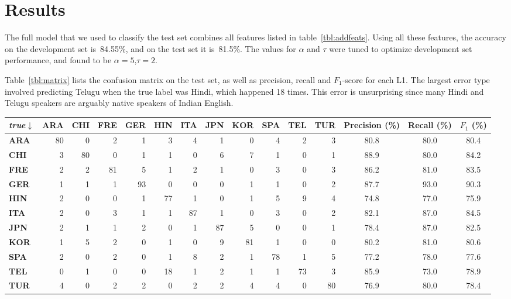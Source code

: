 \documentclass[11pt,letterpaper]{article}
\newcommand{\tref}[1]{table~\ref{#1}}
\newcommand{\Tref}[1]{Table~\ref{#1}}
\begin{document}
\section{Results}
\label{sec:results}
The full model that we used to classify the test set combines all
features listed in \tref{tbl:addfeats}. Using all these features, the
accuracy on the development set is~84.55\%, and on the test set it
is~81.5\%. The values for $\alpha$ and $\tau$ were tuned to optimize development set performance, and found to be $\alpha=5$,$\tau=2$.

\Tref{tbl:matrix} lists the confusion matrix on the test
set, as well as precision, recall and $F_1$-score for each L1.
The largest error type involved predicting Telugu when the true label 
was Hindi, which happened 18 times.  This error is unsurprising since many Hindi and Telugu speakers are arguably native speakers of Indian English.



\begin{table*}[hbt]
\small\centering
\begin{tabular}{>{\bf}l|r@{ }r@{ }r@{ }r@{ }r@{ }r@{ }r@{ }r@{ }r@{ }r@{ }r|ccc} %
\emph{true}$\downarrow$	& \bf ARA & \bf CHI & \bf FRE & \bf GER & \bf HIN & \bf ITA & \bf JPN & \bf KOR & \bf SPA & \bf TEL & \bf TUR & \bf Precision (\%) & \bf Recall (\%) & \bf $F_1$ (\%) \\
\hline
ARA & 80 & 0 & 2 & 1 & 3 & 4 & 1 & 0 & 4 & 2 & 3 & 80.8 & 80.0 & 80.4 \\
CHI & 3 & 80 & 0 & 1 & 1 & 0 & 6 & 7 & 1 & 0 & 1 & 88.9 & 80.0 & 84.2 \\
FRE & 2 & 2 & 81 & 5 & 1 & 2 & 1 & 0 & 3 & 0 & 3 & 86.2 & 81.0 & 83.5 \\
\hline
GER & 1 & 1 & 1 & 93 & 0 & 0 & 0 & 1 & 1 & 0 & 2 & 87.7 & 93.0 & 90.3 \\
HIN & 2 & 0 & 0 & 1 & 77 & 1 & 0 & 1 & 5 & 9 & 4 & 74.8 & 77.0 & 75.9 \\
ITA & 2 & 0 & 3 & 1 & 1 & 87 & 1 & 0 & 3 & 0 & 2 & 82.1 & 87.0 & 84.5 \\
\hline
JPN & 2 & 1 & 1 & 2 & 0 & 1 & 87 & 5 & 0 & 0 & 1 & 78.4 & 87.0 & 82.5 \\
KOR & 1 & 5 & 2 & 0 & 1 & 0 & 9 & 81 & 1 & 0 & 0 & 80.2 & 81.0 & 80.6 \\
SPA & 2 & 0 & 2 & 0 & 1 & 8 & 2 & 1 & 78 & 1 & 5 & 77.2 & 78.0 & 77.6 \\
\hline
TEL & 0 & 1 & 0 & 0 & 18 & 1 & 2 & 1 & 1 & 73 & 3 & 85.9 & 73.0 & 78.9 \\
TUR & 4 & 0 & 2 & 2 & 0 & 2 & 2 & 4 & 4 & 0 & 80 & 76.9 & 80.0 & 78.4 \\
\end{tabular}
\caption{Official test set confusion matrix with the full model. 
Accuracy is 81.5\%.}
\label{tbl:matrix}
\end{table*}
\end{document}
